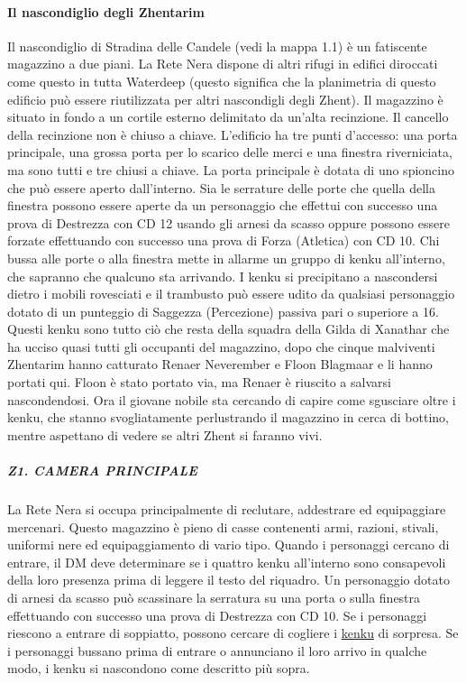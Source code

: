 \documentclass{article}
\begin{document}
\paragraph{Il nascondiglio degli Zhentarim}
Il nascondiglio di Stradina delle Candele (vedi la mappa
1.1) è un fatiscente magazzino a due piani. La Rete Nera
dispone di altri rifugi in edifici diroccati come questo in
tutta Waterdeep (questo significa che la planimetria di
questo edificio può essere riutilizzata per altri nascondigli
degli Zhent).
Il magazzino è situato in fondo a un cortile esterno
delimitato da un’alta recinzione. Il cancello della recinzione
non è chiuso a chiave. L'edificio ha tre punti d'accesso:
una porta principale, una grossa porta per lo scarico delle
merci e una finestra riverniciata, ma sono tutti e tre chiusi
a chiave. La porta principale è dotata di uno spioncino
che può essere aperto dall'interno. Sia le serrature delle
porte che quella della finestra possono essere aperte da
un personaggio che effettui con successo una prova di
Destrezza con CD 12 usando gli arnesi da scasso oppure
possono essere forzate effettuando con successo una prova
di Forza (Atletica) con CD 10.
Chi bussa alle porte o alla finestra mette in allarme un
gruppo di kenku all'interno, che sapranno che qualcuno
sta arrivando. I kenku si precipitano a nascondersi
dietro i mobili rovesciati e il trambusto può essere
udito da qualsiasi personaggio dotato di un punteggio
di Saggezza (Percezione) passiva pari o superiore a 16.
Questi kenku sono tutto ciò che resta della squadra della
Gilda di Xanathar che ha ucciso quasi tutti gli occupanti
del magazzino, dopo che cinque malviventi Zhentarim
hanno catturato Renaer Neverember e Floon Blagmaar e
li hanno portati qui. Floon è stato portato via, ma Renaer
è riuscito a salvarsi nascondendosi. Ora il giovane nobile
sta cercando di capire come sgusciare oltre i kenku, che
stanno svogliatamente perlustrando il magazzino in cerca
di bottino, mentre aspettano di vedere se altri Zhent si
faranno vivi.

\subparagraph{Z1. CAMERA PRINCIPALE}La Rete Nera si occupa principalmente di reclutare,
addestrare ed equipaggiare mercenari. Questo magazzino
è pieno di casse contenenti armi, razioni, stivali, uniformi
nere ed equipaggiamento di vario tipo.
Quando i personaggi cercano di entrare, il DM
deve determinare se i quattro kenku all'interno sono
consapevoli della loro presenza prima di leggere il testo
del riquadro.
Un personaggio dotato di arnesi da scasso può
scassinare la serratura su una porta o sulla finestra
effettuando con successo una prova di Destrezza con
CD 10. Se i personaggi riescono a entrare di soppiatto,
possono cercare di cogliere i \hyperlink{kenk}{kenku} di sorpresa. Se i
personaggi bussano prima di entrare o annunciano il
loro arrivo in qualche modo, i kenku si nascondono come
descritto più sopra. \\
\end{document}
